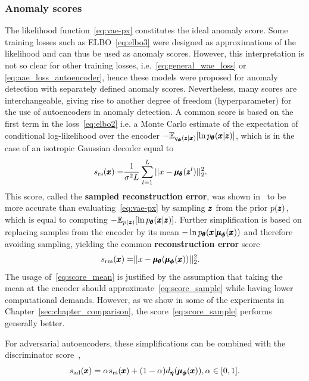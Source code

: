 \subsubsection{Anomaly scores}
The likelihood function~\eqref{eq:vae-px} constitutes the ideal anomaly score. Some training losses such as ELBO~\eqref{eq:elbo3} were designed as approximations of the likelihood and can thus be used as anomaly scores. However, this interpretation is not so clear for other training losses, i.e.~\eqref{eq:general_wae_loss} or \eqref{eq:aae_loss_autoencoder}, hence these models were proposed for anomaly detection with separately defined anomaly scores. Nevertheless, many scores are interchangeable, giving rise to another degree of freedom (hyperparameter) for the use of autoencoders in anomaly detection. A common score is based on the first term in the loss~\eqref{eq:elbo2} i.e. a Monte Carlo estimate of the expectation of conditional log-likelihood over the encoder $- \mathbb{E}_{q_{\vc{\phi}}(\vc{z}|\vc{x})} \left[ \ln p_{\vc{\theta}}(\vc{x}| \vc{z}) \right]$, which is in the case of an isotropic Gaussian decoder equal to
\begin{align} \label{eq:score_sample}
s_{\text{rs}}(\pmb{{x}}) = & \frac{1}{\sigma^2 L} \sum_{l=1}^L \vert \vert x - \pmb{{\mu}}_{\pmb{{\theta}}} (\pmb{{z}} ^l) \vert \vert_2^2.
\end{align}
This score, called the \textbf{sampled reconstruction error}, was shown in~\cite{xu2018unsupervised} to be more accurate than evaluating~\eqref{eq:vae-px} by sampling $\pmb{{z}}$ from the prior $p(\pmb{{z}})$, which is equal to computing $- \mathbb{E}_{p(\vc{z})} \left[ \ln p_{\vc{\theta}}(\vc{x}| \vc{z}) \right]$. Further simplification is based on replacing samples from the encoder by its mean $- \ln p_{\pmb{{\theta}}}(\pmb{{x}}| \pmb{{\mu}}_{\pmb{{\phi}}}(\pmb{{x}}))$ and therefore avoiding sampling, yielding the common \textbf{reconstruction error} score
\begin{align} \label{eq:score_mean}
s_{\text{rm}}(\pmb{{x}}) = & \vert \vert x - \pmb{{\mu}}_{\pmb{{\theta}}} ( \pmb{{\mu}}_{\pmb{{\phi}}}(\pmb{{x}}) )  \vert \vert_2^2.
\end{align}
The usage of~\eqref{eq:score_mean} is justified by the assumption that taking the mean at the encoder should approximate~\eqref{eq:score_sample} while having lower computational demands. However, as we show in some of the experiments in Chapter~\ref{sec:chapter_comparison}, the score~\eqref{eq:score_sample} performs generally better.

For adversarial autoencoders, these simplifications can be combined with the discriminator score~\cite{schlegl2017unsupervised, zenatiEfficientGANBasedAnomaly2018},
\begin{equation}
    s_{\text{ad}}(\vc{x}) = \alpha s_{\text{rs}}(\vc{x}) + (1-\alpha) d_{\vc{\eta}}(\vc{\mu}_{\vc{\phi}}(\vc{x})), \alpha \in \left[ 0, 1 \right].
\label{eq:aae_score}
\end{equation}

